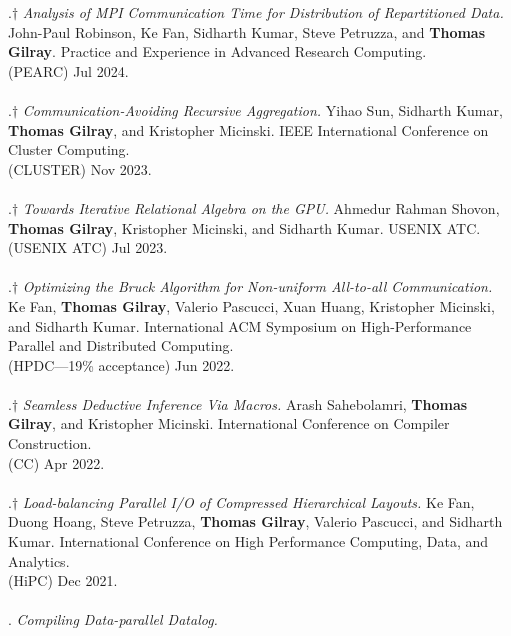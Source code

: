 \paper.$\dagger$ \textit{Analysis of MPI Communication Time for Distribution of Repartitioned Data.}
John-Paul Robinson, Ke Fan, Sidharth Kumar, Steve Petruzza, and \textbf{Thomas Gilray}.
Practice and Experience in Advanced Research Computing.
\\(PEARC) Jul 2024. 
\\ \vspace{-0.1cm}\\
\paper.$\dagger$ \textit{Communication-Avoiding Recursive Aggregation.}
Yihao Sun, Sidharth Kumar, \textbf{Thomas Gilray}, and Kristopher Micinski.
IEEE International Conference on Cluster Computing.
\\(CLUSTER) Nov 2023. 
\\ \vspace{-0.1cm}\\
\paper.$\dagger$ \textit{Towards Iterative Relational Algebra on the GPU.}
Ahmedur Rahman Shovon, \textbf{Thomas Gilray}, Kristopher Micinski, and Sidharth Kumar.
USENIX ATC.
\\(USENIX ATC) Jul 2023. 
\\ \vspace{-0.1cm}\\
\paper.$\dagger$ \textit{Optimizing the Bruck Algorithm for Non-uniform All-to-all Communication.}
Ke Fan, \textbf{Thomas Gilray}, Valerio Pascucci, Xuan Huang, Kristopher Micinski, and Sidharth Kumar.
International ACM Symposium on High-Performance Parallel and Distributed Computing.
\\(HPDC---19\% acceptance) Jun 2022. 
\\ \vspace{-0.1cm}\\
\paper.$\dagger$ \textit{Seamless Deductive Inference Via Macros.}
Arash Sahebolamri, \textbf{Thomas Gilray}, and Kristopher Micinski.
International Conference on Compiler Construction.
\\(CC) Apr 2022. 
\\ \vspace{-0.1cm}\\
\paper.$\dagger$ \textit{Load-balancing Parallel I/O of Compressed Hierarchical Layouts.}
Ke Fan, Duong Hoang, Steve Petruzza, \textbf{Thomas Gilray}, Valerio Pascucci, and Sidharth Kumar.
International Conference on High Performance Computing, Data, and Analytics.
\\(HiPC) Dec 2021. 
\\ \vspace{-0.1cm}\\
\paper. \textit{Compiling Data-parallel Datalog.}
